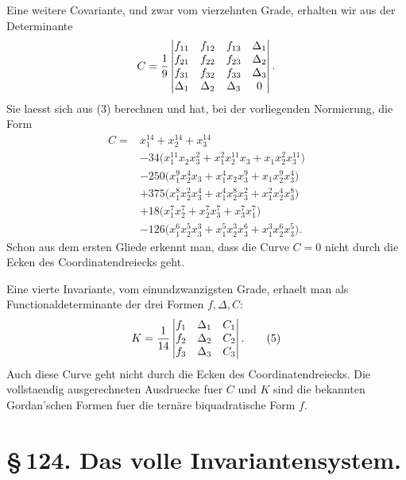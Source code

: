 \documentclass[11pt]{article}
\begin{document}
Eine weitere Covariante, und zwar vom vierzehnten Grade, erhalten wir aus der Determinante
\begin{equation}
C={1\over9}
\begin{vmatrix}
f_{11}&f_{12}&f_{13}&\Delta_1\\
f_{21}&f_{22}&f_{23}&\Delta_2\\
f_{31}&f_{32}&f_{33}&\Delta_3\\
\Delta_1&\Delta_2&\Delta_3&0
\end{vmatrix}.
\end{equation}
Sie laesst sich aus (3) berechnen und hat, bei der vorliegenden Normierung, die Form
\begin{equation}
\begin{aligned}
C={}&x_1^{14}+x_2^{14}+x_3^{14}\\
&-34\bigl(x_1^{11}x_2x_3^2+x_1^2x_2^{11}x_3+x_1x_2^2x_3^{11}\bigr)\\
&-250\bigl(x_1^9x_2^4x_3+x_1^4x_2x_3^9+x_1x_2^9x_3^4\bigr)\\
&+375\bigl(x_1^8x_2^2x_3^4+x_1^4x_2^8x_3^2+x_1^2x_2^4x_3^8\bigr)\\
&+18\bigl(x_1^7x_2^7+x_2^7x_3^7+x_3^7x_1^7\bigr)\\
&-126\bigl(x_1^6x_2^5x_3^3+x_1^5x_2^3x_3^6+x_1^3x_2^6x_3^5\bigr).
\end{aligned}
\tag{4}
\end{equation}
Schon aus dem ersten Gliede erkennt man, dass die Curve \(C=0\) nicht durch die Ecken des Coordinatendreiecks geht.

Eine vierte Invariante, vom einundzwanzigsten Grade, erhaelt man als Functionaldeterminante der drei Formen \(f,\Delta,C\):
\begin{equation}
K={1\over14}
\begin{vmatrix}
f_1&\Delta_1&C_1\\
f_2&\Delta_2&C_2\\
f_3&\Delta_3&C_3
\end{vmatrix}.
\tag{5}
\end{equation}
Auch diese Curve geht nicht durch die Ecken des Coordinatendreiecks. Die vollstaendig ausgerechneten Ausdruecke fuer \(C\) und \(K\) sind die bekannten Gordan'schen Formen fuer die ternäre biquadratische Form \(f\).

\section*{\S\,124. Das volle Invariantensystem.}
\end{document}

